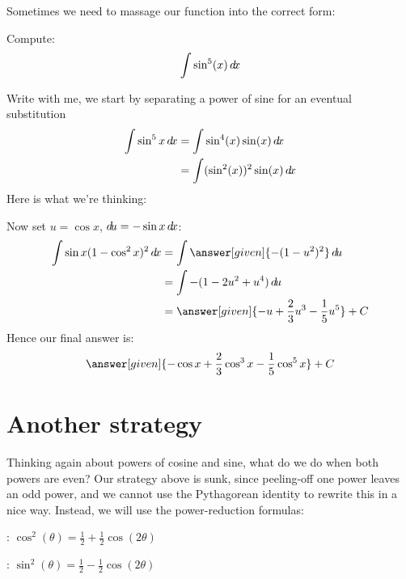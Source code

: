 \documentclass{ximera}
\begin{document}
Sometimes we need to massage our function into the correct form:

\begin{example}
  Compute:
  \[
  \int \sin^5(x) \mathop{}\!d\! x
  \]
  \begin{explanation}
    Write with me, we start by separating a power of sine for an eventual substitution
    \begin{align*}
      \int \sin^5 x\mathop{}\!d\! x &=\int \sin^4(x) \sin(x) \mathop{}\!d\! x\\
      &=\int (\sin^2(x))^2 \sin(x) \mathop{}\!d\! x
    \end{align*}
    Here is what we're thinking:
    \begin{center}%
    \end{center}
    Now set $u=\cos x$, $\mathop{}\!d\! u=-\sin x\mathop{}\!d\! x$:
    \begin{align*}
      \int \sin x (1-\cos^2 x)^2\d x&=\int \answer[given]{-(1-u^2)^2} \d u \\
      &=\int -(1-2u^2+u^4)\d u \\
      &=\answer[given]{-u+\frac{2}{3}u^3-\frac{1}{5}u^5}+C
    \end{align*}
    Hence our final answer is:
    \[
    \answer[given]{-\cos x+\frac{2}{3}\cos^3 x-\frac{1}{5}\cos^5x}+C
    \]
  \end{explanation}
\end{example}

\section{Another strategy}

Thinking again about powers of cosine and sine, what do we do when
both powers are even?  Our strategy above is sunk, since peeling-off
one power leaves an odd power, and we cannot use the Pythagorean
identity to rewrite this in a nice way.  Instead, we will use the
power-reduction formulas:

\begin{description}
\item[Cosine Power-Reduction]: $\cos^2(\theta)= \frac{1}{2}+\frac{1}{2}\cos(2\theta)$ 
\item[Sine Power-Reduction]: $\sin^2(\theta) = \frac{1}{2}-\frac{1}{2}\cos(2\theta)$
\end{description}
\end{document}
